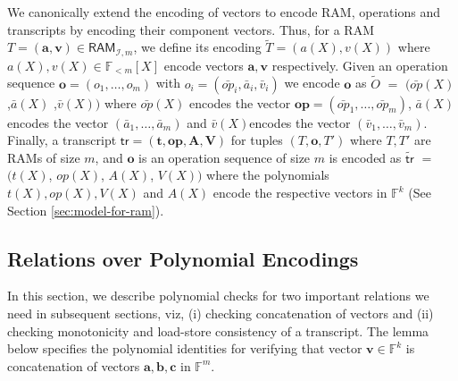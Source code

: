 \documentclass[sigconf]{acmart}
\renewcommand{\vec}{\mathbf} %
\newcommand{\vecT}{\vec{T}}
\newcommand{\op}{{op}} %
\newcommand{\F}{\mathbb{F}}
\newcommand{\wt}[1]{\widetilde{#1}}
\newcommand{\RAM}[2]{\ensuremath{\mathsf{RAM}}_{\mathcal{#1}, {#2}}}
\newcommand{\tr}{\ensuremath{\mathsf{tr}}}
\providecommand{\DIFaddtex}[1]{{\protect\color{blue}\uwave{#1}}} %
\providecommand{\DIFdeltex}[1]{{\protect\color{red}\sout{#1}}}                      %
\providecommand{\DIFaddbegin}{} %
\providecommand{\DIFaddend}{} %
\providecommand{\DIFdelbegin}{} %
\providecommand{\DIFdelend}{} %
\providecommand{\DIFadd}[1]{\texorpdfstring{\DIFaddtex{#1}}{#1}} %
\providecommand{\DIFdel}[1]{\texorpdfstring{\DIFdeltex{#1}}{}} %
\newcommand{\DIFscaledelfig}{0.5}
\newlength{\DIFdelgraphicswidth} %
\newlength{\DIFdelgraphicsheight} %
\newcommand{\DIFaddincludegraphics}[2][]{{\color{blue}\fbox{\DIFOincludegraphics[#1]{#2}}}} %
\newcommand{\DIFdelincludegraphics}[2][]{%
	\sbox{\DIFdelgraphicsbox}{\DIFOincludegraphics[#1]{#2}}%
	\settoboxwidth{\DIFdelgraphicswidth}{\DIFdelgraphicsbox} %
	\settoboxtotalheight{\DIFdelgraphicsheight}{\DIFdelgraphicsbox} %
	\scalebox{\DIFscaledelfig}{%
		\parbox[b]{\DIFdelgraphicswidth}{\usebox{\DIFdelgraphicsbox}\\[-\baselineskip] \rule{\DIFdelgraphicswidth}{0em}}\llap{\resizebox{\DIFdelgraphicswidth}{\DIFdelgraphicsheight}{%
				\setlength{\unitlength}{\DIFdelgraphicswidth}%
				\begin{picture}(1,1)%
					\thicklines\linethickness{2pt} %
					{\color[rgb]{1,0,0}\put(0,0){\framebox(1,1){}}}%
					{\color[rgb]{1,0,0}\put(0,0){\line( 1,1){1}}}%
					{\color[rgb]{1,0,0}\put(0,1){\line(1,-1){1}}}%
				\end{picture}%
			}\hspace*{3pt}}} %
} %
\DeclareRobustCommand{\DIFaddbegin}{\DIFOaddbegin \let\includegraphics\DIFaddincludegraphics} %
\DeclareRobustCommand{\DIFaddend}{\DIFOaddend \let\includegraphics\DIFOincludegraphics} %
\DeclareRobustCommand{\DIFdelbegin}{\DIFOdelbegin \let\includegraphics\DIFdelincludegraphics} %
\DeclareRobustCommand{\DIFdelend}{\DIFOaddend \let\includegraphics\DIFOincludegraphics} %
\begin{document}
		We canonically extend the encoding of vectors to encode RAM, operations and transcripts by encoding their component vectors.
		Thus, for a RAM \DIFdelbegin \DIFdel{$T=(\vec{a},\vec{v})\in \RAM{I}{m}$}\DIFdelend \DIFaddbegin \DIFadd{$\vecT=(\vec{a},\vec{v})\in \RAM{I}{m}$}\DIFaddend , we define its encoding
		$\wt{T}=(a(X),v(X))$ where $a(X),v(X)\in \F_{<m}[X]$ encode vectors $\vec{a}, \vec{v}$ respectively.
		Given an operation sequence
		$\vec{o}=(o_1,\ldots,o_m)$ with $o_i=(\bar{\op}_i,\bar{a}_i,\bar{v}_i)$ we encode $\vec{o}$ as
		$\wt{O}$ $=$ $(\bar{\op}(X)$ ,$\bar{a}(X)$ ,$\bar{v}(X))$
		where $\bar{\op}(X)$ encodes the
		vector $\vec{\op}=(\bar{\op}_1,\ldots,\bar{\op}_m)$, $\bar{a}(X)$ encodes the vector $(\bar{a}_1,\ldots,\bar{a}_m)$ and
		$\bar{v}(X)$encodes the vector $(\bar{v}_1,\ldots,\bar{v}_m)$.
		Finally, a transcript $\tr=(\vec{t},\vec{\op},\vec{A},\vec{V})$ for tuples \DIFdelbegin \DIFdel{$(T,\vec{o},T')$ }\DIFdelend \DIFaddbegin \DIFadd{$(\vecT,\vec{o},\vecT')$ }\DIFaddend where \DIFdelbegin \DIFdel{$T,T'$ }\DIFdelend \DIFaddbegin \DIFadd{$\vecT,\vecT'$ }\DIFaddend are RAMs of size $m$,
		and $\vec{o}$ is an operation sequence of size $m$ is encoded as $\wt{\tr}$ $=$ $(t(X)$, $\op(X)$, $A(X)$, $V(X))$
		where the polynomials $t(X),\op(X),V(X)$ and $A(X)$ encode the respective vectors in $\F^k$ (See Section \ref{sec:model-for-ram}).
		
		\subsection{Relations over Polynomial Encodings}\label{subsec:encoded-relations}
		In this section, we describe polynomial checks for two important relations we need in subsequent sections, viz,
		(i) checking concatenation of vectors and (ii) checking monotonicity and load-store consistency of a transcript.
		The lemma below specifies the polynomial identities for verifying
		that vector $\vec{v}\in \F^k$ is concatenation of vectors $\vec{a},\vec{b},\vec{c}$ in $\F^m$.
		
\end{document}
